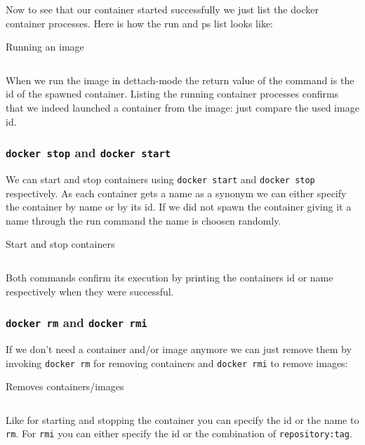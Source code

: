 			Now to see that our container started successfully we just list the docker container processes. Here is how the run and ps list looks like:
			\begin{listing}[H]
				\caption{Running an image}
				\label{lst:p01:ch05:run_image}
				\inputminted{text}{\relative{chapter_04/section_5.1.2/run_image.lst}}
			\end{listing}
			When we run the image in dettach-mode the return value of the command is the id of the spawned container. Listing the running container processes confirms that we indeed launched a container from the image: just compare the used image id.
			\subsubsection{\texttt{docker stop} and \texttt{docker start}}
			We can start and stop containers using \texttt{docker start} and \texttt{docker stop} respectively. As each container gets a name as a synonym we can either specify the container by name or by its id. If we did not spawn the container giving it a name through the run command the name is choosen randomly.
			\begin{listing}[H]
				\caption{Start and stop containers}
				\label{lst:p01:ch05:start_stop_containers}
				\inputminted{text}{\relative{chapter_04/section_5.1.2/start_stop_containers.lst}}
			\end{listing}
			Both commands confirm its execution by printing the containers id or name respectively when they were successful.
			\subsubsection{\texttt{docker rm} and \texttt{docker rmi}}
			If we don't need a container and/or image anymore we can just remove them by invoking \texttt{docker rm} for removing containers and \texttt{docker rmi} to remove images:
			\begin{listing}[H]
				\caption{Removes containers/images}
				\label{lst:p01:ch05:remove_containers_images}
				\inputminted{text}{\relative{chapter_04/section_5.1.2/remove_containers_images.lst}}
			\end{listing}
			Like for starting and stopping the container you can specify the id or the name to \texttt{rm}. For \texttt{rmi} you can either specify the id or the combination of \texttt{repository:tag}.
